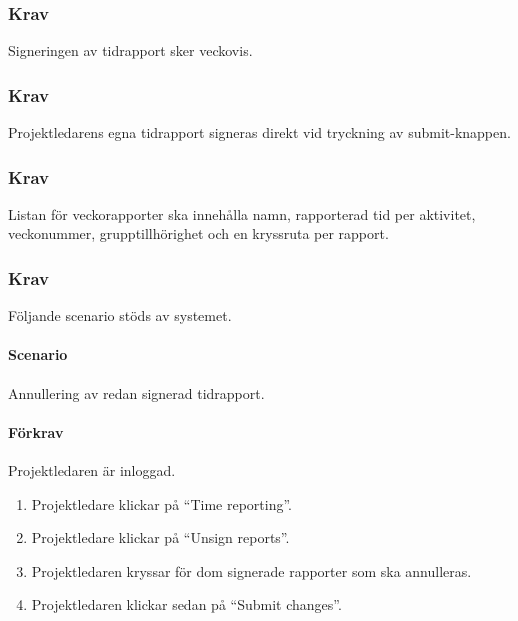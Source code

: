 \documentclass[paper=a4, fontsize=11pt,twoside]{article}
\begin{document}
\paragraph{}

\subsubsection{Krav}
Signeringen av tidrapport sker veckovis.

\paragraph{}

\subsubsection{Krav}
Projektledarens egna tidrapport signeras direkt vid tryckning av submit-knappen.

\paragraph{}

\subsubsection{Krav}
Listan för veckorapporter ska innehålla namn, rapporterad tid per aktivitet, veckonummer, grupptillhörighet och en kryssruta per rapport.

\paragraph{}

\subsubsection{Krav}
Följande scenario stöds av systemet.
\paragraph{Scenario} Annullering av redan signerad tidrapport.
\paragraph{Förkrav} Projektledaren är inloggad.
\begin{enumerate}
\item Projektledare klickar på “Time reporting”.
\item Projektledare klickar på “Unsign reports”.
\item Projektledaren kryssar för dom signerade rapporter som ska annulleras.
\item Projektledaren klickar sedan på “Submit changes”.
\end{enumerate}
\end{document}
